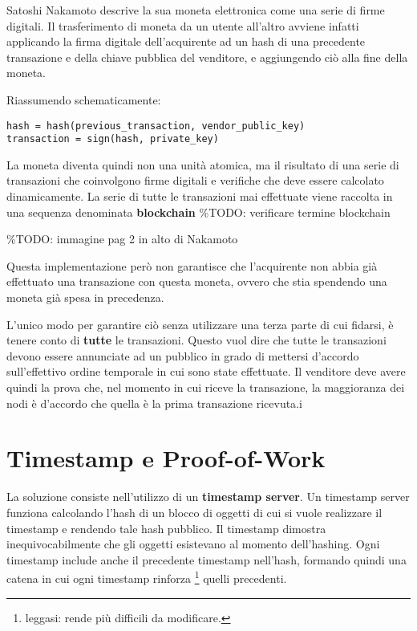 Satoshi Nakamoto descrive la sua moneta elettronica come una serie di
firme digitali. Il trasferimento di moneta da un utente all'altro
avviene infatti applicando la firma digitale dell'acquirente ad un hash
di una precedente transazione e della chiave pubblica del venditore, e
aggiungendo ciò alla fine della moneta.

Riassumendo schematicamente:

\begin{verbatim}
hash = hash(previous_transaction, vendor_public_key)
transaction = sign(hash, private_key)
\end{verbatim}

La moneta diventa quindi non una unità atomica, ma il risultato di una
serie di transazioni che coinvolgono firme digitali e verifiche che deve
essere calcolato dinamicamente. La serie di tutte le transazioni mai
effettuate viene raccolta in una sequenza denominata \textbf{blockchain}
\%TODO: verificare termine blockchain

\%TODO: immagine pag 2 in alto di Nakamoto

Questa implementazione però non garantisce che l'acquirente non abbia
già effettuato una transazione con questa moneta, ovvero che stia
spendendo una moneta già spesa in precedenza.

L'unico modo per garantire ciò senza utilizzare una terza parte di cui
fidarsi, è tenere conto di \textbf{tutte} le transazioni. Questo vuol
dire che tutte le transazioni devono essere annunciate ad un pubblico in
grado di mettersi d'accordo sull'effettivo ordine temporale in cui sono
state effettuate. Il venditore deve avere quindi la prova che, nel
momento in cui riceve la transazione, la maggioranza dei nodi è
d'accordo che quella è la prima transazione ricevuta.i

\section{Timestamp e Proof-of-Work}\label{timestamp-e-proof-of-work}

La soluzione consiste nell'utilizzo di un \textbf{timestamp server}. Un
timestamp server funziona calcolando l'hash di un blocco di oggetti di
cui si vuole realizzare il timestamp e rendendo tale hash pubblico. Il
timestamp dimostra inequivocabilmente che gli oggetti esistevano al
momento dell'hashing. Ogni timestamp include anche il precedente
timestamp nell'hash, formando quindi una catena in cui ogni timestamp
rinforza \footnote{leggasi: rende più difficili da modificare.} quelli
precedenti.

